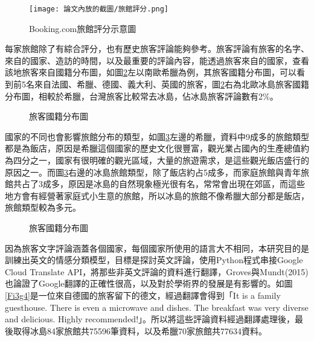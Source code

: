 	\begin{figure}[H]
	\centering
	\texttt{[image: 論文內放的截圖/旅館評分.png]}
	\caption{Booking.com旅館評分示意圖}
	\label{Fi3g2}
	\end{figure}
	
\newpage
	
	每家旅館除了有綜合評分，也有歷史旅客評論能夠參考。旅客評論有旅客的名字、來自的國家、造訪的時間，以及最重要的評論內容，能透過旅客來自的國家，查看該地旅客來自國籍分布圖，如圖\ref{Fi3g3}左以南歐希臘為例，其旅客國籍分布圖，可以看到前5名來自法國、希臘、德國、義大利、英國的旅客，圖\ref{Fi3g3}右為北歐冰島旅客國籍分布圖，相較於希臘，台灣旅客比較常去冰島，佔冰島旅客評論數有2\%。\\
	
	\begin{figure}[h!]
	\centering
	\caption{旅客國籍分布圖}\label{Fi3g3}
	\end{figure}
	
	國家的不同也會影響旅館分布的類型，如圖\ref{Fi3g3-1}左邊的希臘，資料中9成多的旅館類型都是為飯店，原因是希臘這個國家的歷史文化很豐富，觀光業占國內的生產總值約為四分之一，國家有很明確的觀光區域，大量的旅遊需求，是這些觀光飯店盛行的原因之一。而圖\ref{Fi3g3-1}右邊的冰島旅館類型，除了飯店約占5成多，而家庭旅館與青年旅館共占了3成多，原因是冰島的自然現象極光很有名，常常會出現在郊區，而這些地方會有經營著家庭式小生意的旅館，所以冰島的旅館不像希臘大部分都是飯店，旅館類型較為多元。
	
\newpage
	
	\begin{figure}[h!]
	\centering
	\caption{旅客國籍分布圖}\label{Fi3g3-1}
	\end{figure}
	
	因為旅客文字評論涵蓋各個國家，每個國家所使用的語言大不相同，本研究目的是訓練出英文的情感分類模型，目標是探討英文評論，使用Python程式串接Google Cloud Translate API，將那些非英文評論的資料進行翻譯，Groves與Mundt(2015)也論證了Google翻譯的正確性很高，以及對於學術界的發展是有影響的。如圖\ref{Fi3g4}是一位來自德國的旅客留下的德文，經過翻譯會得到「It is a family guesthouse. There is even a microwave and dishes. The breakfast was very diverse and delicious. Highly recommended!」。所以將這些評論資料經過翻譯處理後，最後取得冰島84家旅館共75596筆資料，以及希臘70家旅館共77634資料。\\
	
